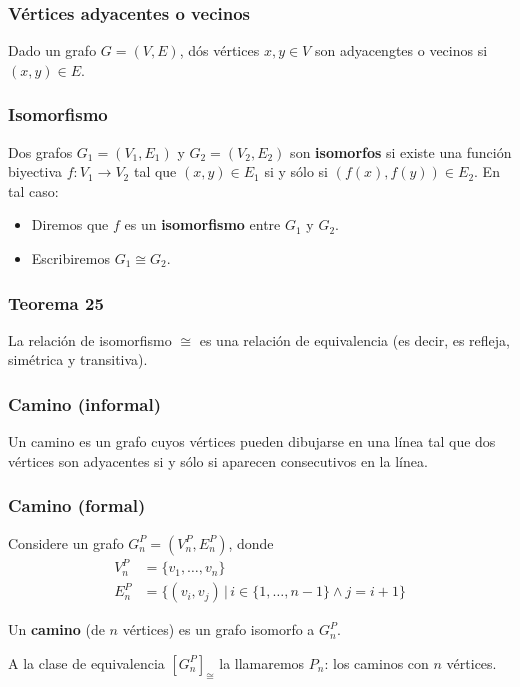 \begin{multicols}{2}
    \subsubsection*{Vértices adyacentes o vecinos}
    Dado un grafo $G = (V, E)$, dós vértices $x,y \in V$ son adyacengtes o vecinos si $(x,y) \in E$.
    
    \subsubsection*{Isomorfismo}
    Dos grafos $G_1 = (V_1, E_1)$ y $G_2 = (V_2, E_2)$ son \textbf{isomorfos} si existe una función biyectiva $f: V_1 \rightarrow V_2$ tal que $(x,y) \in E_1$ si y sólo si $(f(x), f(y)) \in E_2$. En tal caso:
    \begin{itemize}
        \item Diremos que $f$ es un \textbf{isomorfismo} entre $G_1$ y $G_2$.
        \item Escribiremos $G_1 \cong G_2$.
    \end{itemize}
    
    \subsubsection*{Teorema 25}
    La relación de isomorfismo $\cong$ es una relación de equivalencia (es decir, es refleja, simétrica y transitiva).
    
    \subsubsection*{Camino (informal)}
    Un camino es un grafo cuyos vértices pueden dibujarse en una línea tal que dos vértices son adyacentes si y sólo si aparecen consecutivos en la línea.
    
    \subsubsection*{Camino (formal)}
    Considere un grafo $G_n^P = (V_n^P, E_n^P)$, donde 
    \begin{align*}
        V_n^P &= \{ v_1, \ldots, v_n \} \\ 
        E_n^P &= \{ (v_i, v_j) \,|\, i \in \{1,\ldots, n - 1\} \wedge j = i + 1\}
    \end{align*}
    
    Un \textbf{camino} (de $n$ vértices) es un grafo isomorfo a $G_n^P$. \p
    
    A la clase de equivalencia $[G_n^P]_{\cong}$ la llamaremos $P_n$: los caminos con $n$ vértices.
    

\end{multicols}
